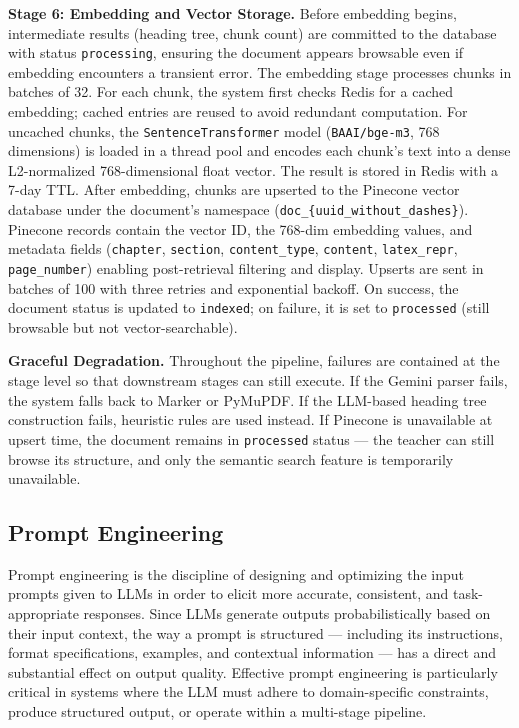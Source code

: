 \documentclass[12pt,a4paper]{article}
\begin{document}
\textbf{Stage 6: Embedding and Vector Storage.} Before embedding begins, intermediate results (heading tree, chunk count) are committed to the database with status \texttt{processing}, ensuring the document appears browsable even if embedding encounters a transient error. The embedding stage processes chunks in batches of 32. For each chunk, the system first checks Redis for a cached embedding; cached entries are reused to avoid redundant computation. For uncached chunks, the \texttt{SentenceTransformer} model (\texttt{BAAI/bge-m3}, 768 dimensions) is loaded in a thread pool and encodes each chunk's text into a dense L2-normalized 768-dimensional float vector. The result is stored in Redis with a 7-day TTL. After embedding, chunks are upserted to the Pinecone vector database under the document's namespace (\texttt{doc\_\{uuid\_without\_dashes\}}). Pinecone records contain the vector ID, the 768-dim embedding values, and metadata fields (\texttt{chapter}, \texttt{section}, \texttt{content\_type}, \texttt{content}, \texttt{latex\_repr}, \texttt{page\_number}) enabling post-retrieval filtering and display. Upserts are sent in batches of 100 with three retries and exponential backoff. On success, the document status is updated to \texttt{indexed}; on failure, it is set to \texttt{processed} (still browsable but not vector-searchable).

\textbf{Graceful Degradation.} Throughout the pipeline, failures are contained at the stage level so that downstream stages can still execute. If the Gemini parser fails, the system falls back to Marker or PyMuPDF. If the LLM-based heading tree construction fails, heuristic rules are used instead. If Pinecone is unavailable at upsert time, the document remains in \texttt{processed} status — the teacher can still browse its structure, and only the semantic search feature is temporarily unavailable.

\subsection{Prompt Engineering}

Prompt engineering is the discipline of designing and optimizing the input prompts given to LLMs in order to elicit more accurate, consistent, and task-appropriate responses. Since LLMs generate outputs probabilistically based on their input context, the way a prompt is structured — including its instructions, format specifications, examples, and contextual information — has a direct and substantial effect on output quality. Effective prompt engineering is particularly critical in systems where the LLM must adhere to domain-specific constraints, produce structured output, or operate within a multi-stage pipeline.
\end{document}
